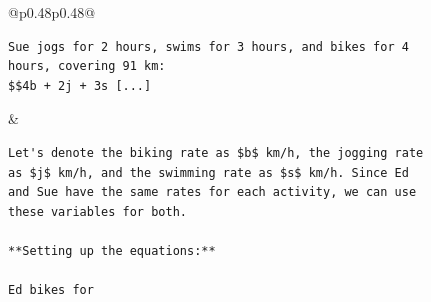 \begin{figure}[p]
\begin{tabular}{@{}p{}p{}@{}}
\begin{tcolorbox}
\begin{lstlisting}
Sue jogs for 2 hours, swims for 3 hours, and bikes for 4 hours, covering 91 km:
$$4b + 2j + 3s [...]
\end{lstlisting}
\end{tcolorbox} & \begin{tcolorbox}[
    colback=gray!3, colframe=red!60!black, boxrule=0.5pt,
    title={\scriptsize\textbf{truncation applied}},
    fonttitle=\sffamily, coltitle=white, colbacktitle=red!60!black,
    left=3pt, right=3pt, top=1pt, bottom=1pt
]
\begin{lstlisting}
Let's denote the biking rate as $b$ km/h, the jogging rate as $j$ km/h, and the swimming rate as $s$ km/h. Since Ed and Sue have the same rates for each activity, we can use these variables for both.

**Setting up the equations:**

Ed bikes for
\end{lstlisting}
\end{tcolorbox} \\[6pt]
\end{tabular}
\end{figure}